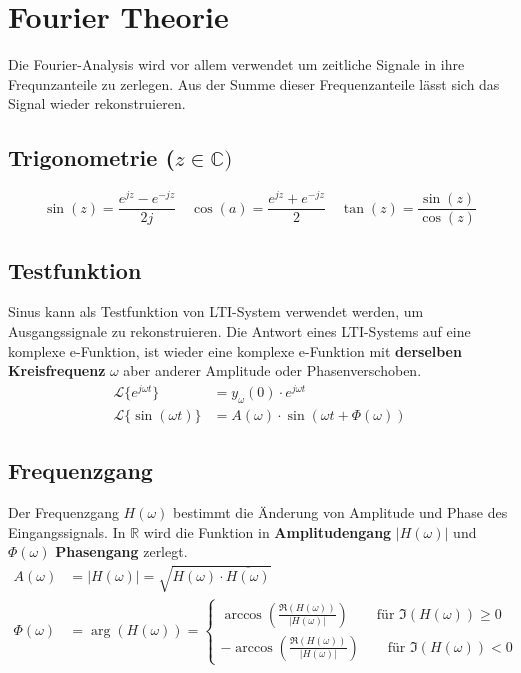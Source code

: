 \section{Fourier Theorie}
Die Fourier-Analysis wird vor allem verwendet um zeitliche Signale in ihre Frequnzanteile zu zerlegen. Aus der Summe dieser Frequenzanteile lässt sich das Signal wieder rekonstruieren.

\subsection{Trigonometrie ($z \in \mathbb{C})$}
\[\sin(z) = \frac{e^{jz} -e^{-jz}}{2j} \quad \cos(a) = \frac{e^{jz} +e^{-jz}}{2} \quad \tan(z) = \frac{\sin(z)}{\cos(z)}\]

\subsection{Testfunktion}
Sinus kann als Testfunktion von LTI-System verwendet werden, um Ausgangssignale zu rekonstruieren. Die Antwort eines LTI-Systems auf eine komplexe e-Funktion, ist wieder eine komplexe e-Funktion mit \textbf{derselben Kreisfrequenz} $\omega$ aber anderer Amplitude oder Phasenverschoben.
\begin{align*}
	\mathcal{L}\{e^{j\omega t}\} &= y_\omega(0) \cdot e^{j\omega t}\\
	\mathcal{L}\{\sin(\omega t)\} &= A(\omega) \cdot \sin(\omega t + \Phi(\omega))
\end{align*}

\subsection{Frequenzgang}
Der Frequenzgang $H(\omega)$ bestimmt die Änderung von Amplitude und Phase des Eingangssignals. In $\mathbb{R}$ wird die Funktion in \textbf{Amplitudengang} $\left|H(\omega)\right|$ und $\Phi(\omega)$ \textbf{Phasengang} zerlegt.
\begin{align*}
	A(\omega) &= \left|H(\omega)\right| = \sqrt{H(\omega) \cdot \overline{H(\omega)}} \\
	\Phi(\omega) &= \arg(H(\omega)) = \begin{cases*}
		\arccos\left(\frac{\Re(H(\omega))}{|H(\omega)|}\right) \qquad \text{für } \Im(H(\omega)) \geq 0 \\
		-\arccos\left(\frac{\Re(H(\omega))}{|H(\omega)|}\right) \qquad \text{für } \Im(H(\omega)) < 0
	\end{cases*}
\end{align*}

